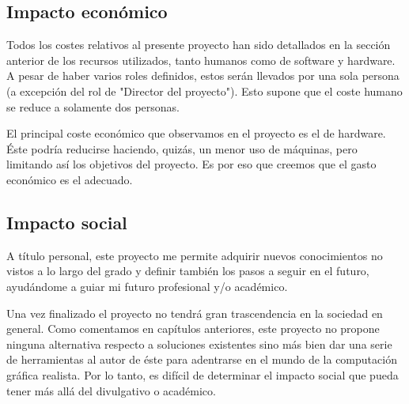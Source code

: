 \documentclass[titlepage,12pt]{report}
\begin{document}
\subsection{Impacto económico}

Todos los costes relativos al presente proyecto han sido detallados en la sección anterior de los recursos utilizados, tanto humanos como de software y hardware. A pesar de haber varios roles definidos, estos serán llevados por una sola persona (a excepción del rol de "Director del proyecto"). Esto supone que el coste humano se reduce a solamente dos personas. 

El principal coste económico que observamos en el proyecto es el de hardware. Éste podría reducirse haciendo, quizás, un menor uso de máquinas, pero limitando así los objetivos del proyecto. Es por eso que creemos que el gasto económico es el adecuado.

\subsection{Impacto social}

A título personal, este proyecto me permite adquirir nuevos conocimientos no vistos a lo largo del grado y definir también los pasos a seguir en el futuro, ayudándome a guiar mi futuro profesional y/o académico.

Una vez finalizado el proyecto no tendrá gran trascendencia en la sociedad en general. Como comentamos en capítulos anteriores, este proyecto no propone ninguna alternativa respecto a soluciones existentes sino más bien dar una serie de herramientas al autor de éste para adentrarse en el mundo de la computación gráfica realista. Por lo tanto, es difícil de determinar el impacto social que pueda tener más allá del divulgativo o académico.

\newpage
\nocite{*}

\printbibliography

\listoffigures

\listoftables
\end{document}

